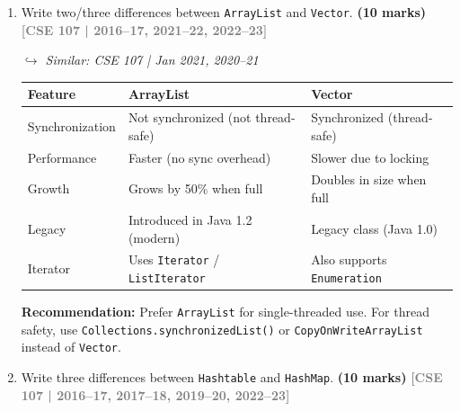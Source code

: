 \documentclass[12pt,a3paper]{article}
\newcommand{\yr}[1]{\hfill\textcolor{gray}{\small\textbf{[#1]}}}
\newcommand{\mk}[1]{\textcolor{orange!70!black}{\small\textbf{(#1 marks)}}}
\newcommand{\variant}[1]{\par\vspace{1pt}\textcolor{blue!50!black}%
  {\footnotesize\textit{$\hookrightarrow$ Similar: #1}}}
\begin{document}
\begin{enumerate}
\begin{tcolorbox}[enhanced,breakable,ansbox,
  colback=cG!4,colframe=cG,boxrule=0.8pt,arc=5pt,
  title={\textbf{Answer --- MyMax with sameMax1 and sameMax2}},
  fonttitle=\bfseries\color{white},colbacktitle=cG]
\begin{lstlisting}[language=Java]
        return Math.abs(this.max() - other.max()) < 1e-9;
    }
}
\end{lstlisting}
\end{tcolorbox}

\item Write two/three differences between \texttt{ArrayList} and \texttt{Vector}. \mk{10}
\yr{CSE 107 | 2016--17, 2021--22, 2022--23}
\variant{CSE 107 | Jan 2021, 2020--21}

\begin{tcolorbox}[enhanced,breakable,ansbox,
  colback=cG!4,colframe=cG,boxrule=0.8pt,arc=5pt,
  title={\textbf{Answer --- ArrayList vs Vector}},
  fonttitle=\bfseries\color{white},colbacktitle=cG]
\begin{center}
\small
\begin{tabular}{@{}lll@{}}
\toprule
\textbf{Feature} & \textbf{ArrayList} & \textbf{Vector} \\
\midrule
Synchronization & Not synchronized (not thread-safe) & Synchronized (thread-safe) \\
Performance     & Faster (no sync overhead)           & Slower due to locking \\
Growth          & Grows by 50\% when full             & Doubles in size when full \\
Legacy          & Introduced in Java 1.2 (modern)     & Legacy class (Java 1.0) \\
Iterator        & Uses \texttt{Iterator} / \texttt{ListIterator} & Also supports \texttt{Enumeration} \\
\bottomrule
\end{tabular}
\end{center}

\medskip
\textbf{Recommendation:} Prefer \texttt{ArrayList} for single-threaded
use. For thread safety, use \texttt{Collections.synchronizedList()} or
\texttt{CopyOnWriteArrayList} instead of \texttt{Vector}.
\end{tcolorbox}



\item Write three differences between \texttt{Hashtable} and \texttt{HashMap}. \mk{10}
\yr{CSE 107 | 2016--17, 2017--18, 2019--20, 2022--23}


\end{enumerate}
\end{document}
